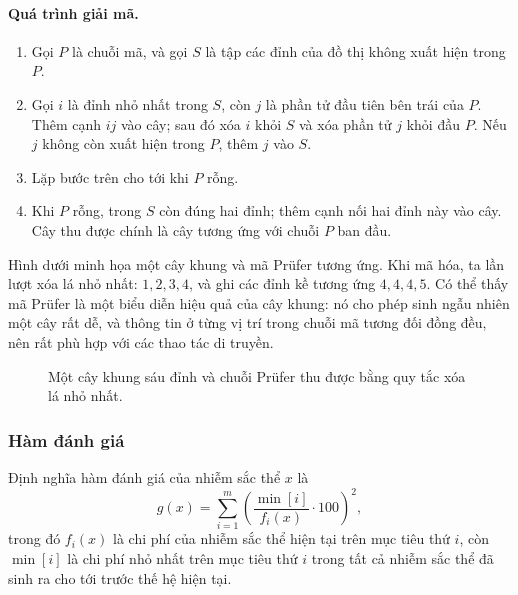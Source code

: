 \documentclass[11pt]{article}
\newcommand{\Pruefer}{Prüfer}
\begin{document}
\paragraph{Quá trình giải mã.}
\begin{enumerate}
  \item Gọi \(P\) là chuỗi mã, và gọi \(S\) là tập các đỉnh của đồ thị không
  xuất hiện trong \(P\).
  \item Gọi \(i\) là đỉnh nhỏ nhất trong \(S\), còn \(j\) là phần tử đầu tiên
  bên trái của \(P\). Thêm cạnh \(ij\) vào cây; sau đó xóa \(i\) khỏi \(S\) và
  xóa phần tử \(j\) khỏi đầu \(P\). Nếu \(j\) không còn xuất hiện trong \(P\),
  thêm \(j\) vào \(S\).
  \item Lặp bước trên cho tới khi \(P\) rỗng.
  \item Khi \(P\) rỗng, trong \(S\) còn đúng hai đỉnh; thêm cạnh nối hai đỉnh
  này vào cây. Cây thu được chính là cây tương ứng với chuỗi \(P\) ban đầu.
\end{enumerate}

Hình dưới minh họa một cây khung và mã \Pruefer{} tương ứng. Khi mã hóa, ta
lần lượt xóa lá nhỏ nhất: \(1,2,3,4\), và ghi các đỉnh kề tương ứng
\(4,4,4,5\). Có thể thấy mã \Pruefer{} là một biểu diễn hiệu quả của cây
khung: nó cho phép sinh ngẫu nhiên một cây rất dễ, và thông tin ở từng vị trí
trong chuỗi mã tương đối đồng đều, nên rất phù hợp với các thao tác di truyền.

\begin{figure}[ht]
\centering
{}
\caption{Một cây khung sáu đỉnh và chuỗi \Pruefer{} thu được bằng quy tắc xóa lá nhỏ nhất.}
\end{figure}

\subsubsection{Hàm đánh giá}

Định nghĩa hàm đánh giá của nhiễm sắc thể \(x\) là
\[
  g(x)=\sum_{i=1}^{m}
  \left(\frac{\operatorname{min}[i]}{f_i(x)}\cdot 100\right)^2,
\]
trong đó \(f_i(x)\) là chi phí của nhiễm sắc thể hiện tại trên mục tiêu thứ
\(i\), còn \(\operatorname{min}[i]\) là chi phí nhỏ nhất trên mục tiêu thứ
\(i\) trong tất cả nhiễm sắc thể đã sinh ra cho tới trước thế hệ hiện tại.
\end{document}
